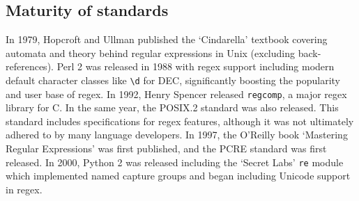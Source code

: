 \subsection{Maturity of standards}
In 1979, Hopcroft and Ullman published the `Cindarella' textbook covering automata and theory behind regular expressions in Unix (excluding back-references).  Perl 2 was released in 1988 with regex support including modern default character classes like \verb!\d! for DEC, significantly boosting the popularity and user base of regex.  In 1992, Henry Spencer released {\tt regcomp}, a major regex library for C.  In the same year, the POSIX.2 standard was also released.  This standard includes specifications for regex features, although it was not ultimately adhered to by many language developers.  In 1997, the O'Reilly book `Mastering Regular Expressions' was first published, and the PCRE standard was first released.  In 2000, Python 2 was released including the `Secret Labs' {\tt re} module which implemented named capture groups and began including Unicode support in regex.
